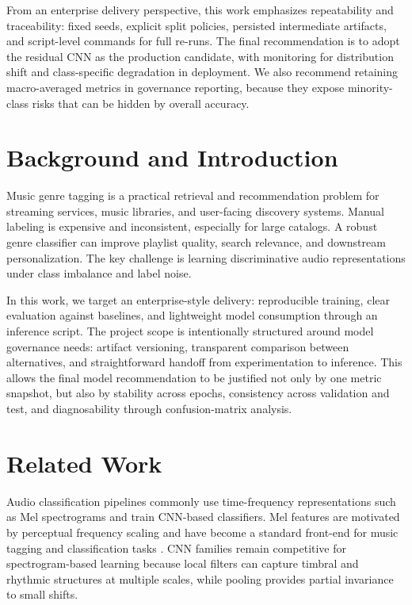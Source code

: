 \documentclass[11pt,a4paper]{article}
\begin{document}
From an enterprise delivery perspective, this work emphasizes repeatability and traceability: fixed seeds, explicit split policies, persisted intermediate artifacts, and script-level commands for full re-runs. The final recommendation is to adopt the residual CNN as the production candidate, with monitoring for distribution shift and class-specific degradation in deployment. We also recommend retaining macro-averaged metrics in governance reporting, because they expose minority-class risks that can be hidden by overall accuracy.

\section{Background and Introduction}
Music genre tagging is a practical retrieval and recommendation problem for streaming services, music libraries, and user-facing discovery systems. Manual labeling is expensive and inconsistent, especially for large catalogs. A robust genre classifier can improve playlist quality, search relevance, and downstream personalization. The key challenge is learning discriminative audio representations under class imbalance and label noise.

In this work, we target an enterprise-style delivery: reproducible training, clear evaluation against baselines, and lightweight model consumption through an inference script. The project scope is intentionally structured around model governance needs: artifact versioning, transparent comparison between alternatives, and straightforward handoff from experimentation to inference. This allows the final model recommendation to be justified not only by one metric snapshot, but also by stability across epochs, consistency across validation and test, and diagnosability through confusion-matrix analysis.

\section{Related Work}
Audio classification pipelines commonly use time-frequency representations such as Mel spectrograms and train CNN-based classifiers. Mel features are motivated by perceptual frequency scaling and have become a standard front-end for music tagging and classification tasks \cite{choi2017transfer, defferrard2017fma}. CNN families remain competitive for spectrogram-based learning because local filters can capture timbral and rhythmic structures at multiple scales, while pooling provides partial invariance to small shifts.
\end{document}
